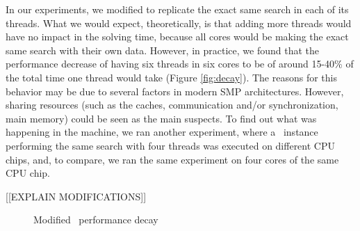 In our experiments, we modified \pling to replicate the exact same
search in each of its threads. What we would expect, theoretically, is
that adding more threads would have no impact in the solving time,
because all cores would be making the exact same search with their own
data. However, in practice, we found that the performance decrease of
having six threads in six cores to be of around 15-40\% of the total
time one thread would take (Figure \ref{fig:decay}). The reasons for
this behavior may be due to several factors in modern SMP
architectures. However, sharing resources (such as the caches,
communication and/or synchronization, main memory) could be seen as
the main suspects. To find out what was happening in the machine, we
ran another experiment, where a \pling\ instance performing the same
search with four threads was executed on different CPU chips, and, to
compare, we ran the same experiment on four cores of the same CPU
chip.


[[EXPLAIN MODIFICATIONS]]

\begin{figure}
  \begin{center}
     
    \caption{Modified \pling\ performance decay}
  \end{center}
\end{figure} 

